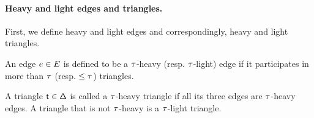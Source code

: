 \paragraph*{Heavy and light edges and triangles.} First, we define heavy and light edges and correspondingly, heavy and light triangles.
\begin{definition}\label{Definition: Heavy and Light Edges}
    An edge $e \in E$ is defined to be a $\tau$-heavy (resp. $\tau$-light) edge if it participates in more than $\tau$ (resp. $\leq \tau$) triangles.
\end{definition}
\begin{definition}\label{Definition: Heavy and Light Triangles}
    A triangle $\sf t \in \Delta$ is called a $\tau$-heavy triangle if all its three edges are $\tau$-heavy edges. A triangle that is not $\tau$-heavy is a $\tau$-light triangle.
\end{definition}


